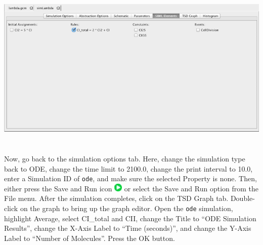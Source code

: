 \documentclass[titlepage,11pt]{article}
\begin{document}
\begin{center}
\includegraphics[height=80mm]{screenshots/SBMLElements}
\end{center}

Now, go back to the simulation options tab.  Here, change the simulation type back to ODE, change the time limit to 2100.0, change the print interval to 10.0, enter a Simulation ID of {\tt ode}, and make sure the selected Property is none.  Then, either press the Save and Run icon \includegraphics{../gui/icons/run-icon} or select the Save and Run option from the File menu.
After the simulation completes, click on the TSD Graph tab.  Double-click on the graph to bring up the graph editor.
Open the {\tt ode} simulation, highlight Average, select CI\_total and CII, change the Title to ``ODE Simulation Results'', change the X-Axis Label to ``Time (seconds)'', and change the Y-Axis Label to ``Number of Molecules''.  
Press the OK button.  
\end{document}
